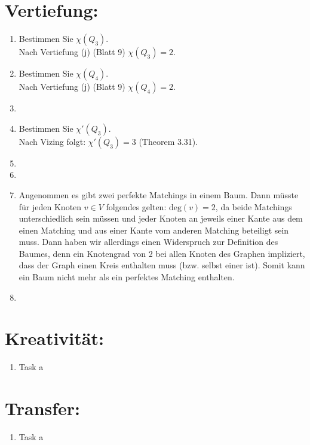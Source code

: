 

\usepackage{ tipa }


    \maketitle
    \section*{Vertiefung:}
    \begin{enumerate}[label=(\alph*)]
        \item Bestimmen Sie $\chi(Q_3)$.\\
        Nach Vertiefung (j) (Blatt 9) $\chi (Q_3) = 2$. 
                
        \item Bestimmen Sie $\chi(Q_4)$.\\
        Nach Vertiefung (j) (Blatt 9) $\chi (Q_4) = 2$.        
                
        \item
               
        \item Bestimmen Sie $\chi'(Q_3)$.\\
        Nach Vizing folgt: $\chi'(Q_3) = 3$ (Theorem 3.31).
        
        \item
        
        \item  
        
        \item 
        Angenommen es gibt zwei perfekte Matchings in einem Baum. Dann müsste für jeden Knoten $v \in V$ folgendes gelten: $\textrm{deg}(v) = 2$, da beide Matchings unterschiedlich sein müssen und jeder Knoten an jeweils einer Kante aus dem einen Matching und aus einer Kante vom anderen Matching beteiligt sein muss. Dann haben wir allerdings einen Widerspruch zur Definition des Baumes, denn ein Knotengrad von 2 bei allen Knoten des Graphen impliziert, dass der Graph einen Kreis enthalten muss (bzw. selbst einer ist). Somit kann ein Baum nicht mehr als ein perfektes Matching enthalten. 
        \item 
        
    \end{enumerate}
    \section*{Kreativität:}
    \begin{enumerate}[label=(\alph*)]
    	\item Task a
    \end{enumerate}
    \section*{Transfer:}
    \begin{enumerate}[label=(\alph*)]
    	\item Task a
    \end{enumerate}







